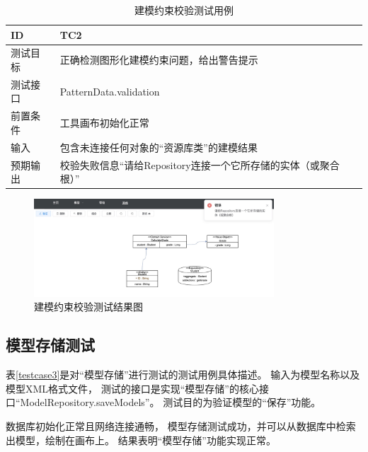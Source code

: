 {\footnotesize
\begin{longtable}[h]{m{80pt}|m{305pt}}
    \caption[建模约束校验测试用例]{建模约束校验测试用例} \label{testcase2} \\
        \hline  
        ID&TC2\\
        \hline
        测试目标&正确检测图形化建模约束问题，给出警告提示\\
        \hline
        测试接口&PatternData.validation\\
        \hline
        前置条件&工具画布初始化正常\\
        \hline
        输入& 包含未连接任何对象的“资源库类”的建模结果\\
        \hline
        预期输出& 校验失败信息“请给Repository连接一个它所存储的实体（或聚合根）”\\
        \hline  
\end{longtable} 

}
    \begin{figure}[h] %
        \centering %
        \includegraphics[width=0.8\textwidth]{FIGs/chapter5/Ftestcase2.jpg} %
        \caption{建模约束校验测试结果图} %
        \label{Ftestcase2} %
    \end{figure}%


\subsection{模型存储测试}

表\ref{testcase3}是对“模型存储”进行测试的测试用例具体描述。
输入为模型名称以及模型XML格式文件，
测试的接口是实现“模型存储”的核心接口“ModelRepository.saveModels”。
测试目的为验证模型的“保存”功能。

数据库初始化正常且网络连接通畅，
模型存储测试成功，并可以从数据库中检索出模型，绘制在画布上。
结果表明“模型存储”功能实现正常。

